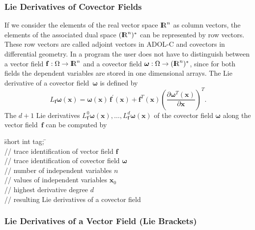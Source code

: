 \documentclass[11pt,twoside]{article}
\newcommand{\R}{{ {\rm I} \kern -.225em {\rm R} }}
\begin{document}
\subsubsection*{Lie Derivatives of Covector Fields}

If we consider the elements of the real vector space $\R^n$ as column vectors, the elements of the associated dual space $(\R^n)^*$ can be represented by row vectors. These row vectors are called adjoint vectors in ADOL-C and covectors in differential geometry.
In a program the user does not have to distinguish between a vector field
$\mathbf f: \Omega \rightarrow \R^n$ and a covector field 
$\boldsymbol{\omega}: \Omega \rightarrow (\R^n)^*$, since for both fields the dependent variables are stored in one dimensional arrays.
The Lie derivative of a covector field~$\boldsymbol{\omega}$ is defined by
\[
 L_{\mathbf f}\boldsymbol{\omega}(\mathbf x)=\boldsymbol{\omega}(\mathbf x)\,{\mathbf f}^\prime(\mathbf x)
 + {\mathbf f}^T(\mathbf x) \left(\frac{\partial \boldsymbol{\omega}^T (\mathbf x)}{\partial \mathbf x}\right)^T.
\]
The $d+1$ Lie derivatives $L_{\mathbf f}^0\boldsymbol{\omega}(\mathbf x),\ldots,L_{\mathbf f}^d\boldsymbol{\omega}(\mathbf x)$ of the covector field $\boldsymbol{\omega}$ along the vector field~$\mathbf{f}$
can be computed by

\begin{tabbing}
\hspace{0.5in}\={\sf short int tag;} \hspace{1.1in}\= \kill    %
\\
         \> // trace identification of vector field $\mathbf f$ \\
         \> // trace identification of covector field $\boldsymbol{\omega}$\\
               \> // number of independent variables $n$\\
          \> // values of independent variables $\mathbf{x}_0$\\
               \> // highest derivative degree $d$\\
 \> // resulting Lie derivatives of a covector field\\
\end{tabbing} 

\subsubsection*{Lie Derivatives of a Vector Field (Lie Brackets)}
\end{document}

